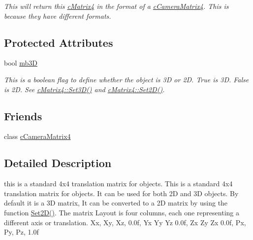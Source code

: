 \begin{DoxyCompactItemize}
\begin{DoxyCompactList}\small\item\em This will return this \hyperlink{classc_matrix4}{cMatrix4} in the format of a \hyperlink{classc_camera_matrix4}{cCameraMatrix4}. This is because they have different formats. \end{DoxyCompactList}\end{DoxyCompactItemize}
\subsection*{Protected Attributes}
\begin{DoxyCompactItemize}
\item 
\hypertarget{classc_matrix4_ac0ebba0d10d97c6657dccd1575f761ab}{
bool \hyperlink{classc_matrix4_ac0ebba0d10d97c6657dccd1575f761ab}{mb3D}}
\label{classc_matrix4_ac0ebba0d10d97c6657dccd1575f761ab}

\begin{DoxyCompactList}\small\item\em This is a boolean flag to define whether the object is 3D or 2D. True is 3D. False is 2D. See \hyperlink{classc_matrix4_a746ce09337cbf6a3292cbe15991efd79}{cMatrix4::Set3D()} and \hyperlink{classc_matrix4_ad24236403317622459c3309938be9d21}{cMatrix4::Set2D()}. \end{DoxyCompactList}\end{DoxyCompactItemize}
\subsection*{Friends}
\begin{DoxyCompactItemize}
\item 
\hypertarget{classc_matrix4_ad892cad8874ae954d2e9de55b17ded93}{
class \hyperlink{classc_matrix4_ad892cad8874ae954d2e9de55b17ded93}{cCameraMatrix4}}
\label{classc_matrix4_ad892cad8874ae954d2e9de55b17ded93}

\end{DoxyCompactItemize}


\subsection{Detailed Description}
this is a standard 4x4 translation matrix for objects. This is a standard 4x4 translation matrix for objects. It can be used for both 2D and 3D objects. By default it is a 3D matrix, It can be converted to a 2D matrix by using the function \hyperlink{classc_matrix4_ad24236403317622459c3309938be9d21}{Set2D()}. The matrix Layout is four columns, each one representing a different axis or translation. Xx, Xy, Xz, 0.0f, Yx Yy Yz 0.0f, Zx Zy Zx 0.0f, Px, Py, Pz, 1.0f 